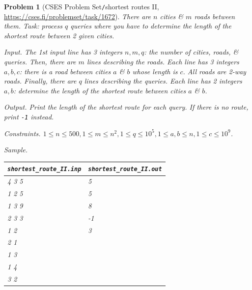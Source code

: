 \documentclass[oneside]{book}
\newtheorem{problem}{Problem}
\begin{document}
\begin{problem}[CSES Problem Set{\tt/}shortest routes II, \url{https://cses.fi/problemset/task/1672}]
	There are $n$ cities \& $m$ roads between them. Task: process $q$ queries where you have to determine the length of the shortest route between 2 given cities.
	\item {\sf Input.} The 1st input line has 3 integers $n,m,q$: the number of cities, roads, \& queries. Then, there are $m$ lines describing the roads. Each line has 3 integers $a,b,c$: there is a road between cities $a$ \& $b$ whose length is $c$. All roads are 2-way roads. Finally, there are $q$ lines describing the queries. Each line has 2 integers $a,b$: determine the length of the shortest route between cities $a$ \& $b$.
	\item {\sf Output.} Print the length of the shortest route for each query. If there is no route, print {\tt-1} instead.
	\item {\sf Constraints.} $1\le n\le500,1\le m\le n^2,1\le q\le10^5,1\le a,b\le n,1\le c\le10^9$.
	\item {\sf Sample.}
	\begin{table}[H]
		\centering
		\begin{tabular}{|l|l|}
			\hline
			\verb|shortest_route_II.inp| & \verb|shortest_route_II.out| \\
			\hline
			4 3 5 & 5 \\
			1 2 5 & 5 \\
			1 3 9 & 8 \\
			2 3 3 & -1 \\
			1 2 & 3 \\
			2 1 & \\
			1 3 & \\
			1 4 & \\
			3 2 & \\
			\hline
		\end{tabular}
	\end{table}
\end{problem}
\end{document}
